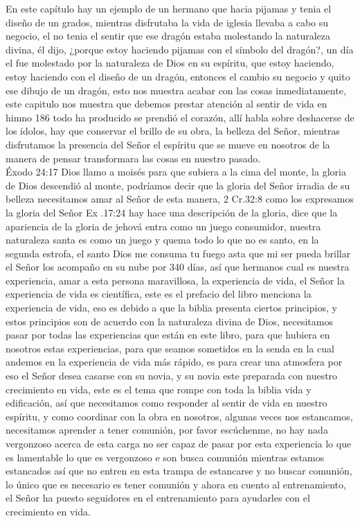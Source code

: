 \documentclass[12pt]{article}
\begin{document}
En este capítulo hay un ejemplo de un hermano que hacia pijamas y tenia el diseño de un grados, mientras disfrutaba la vida de iglesia llevaba a cabo su negocio, el no tenia el sentir que ese dragón estaba molestando la naturaleza divina, él dijo, ¿porque estoy haciendo pijamas con el símbolo del dragón?, un día el fue molestado por la naturaleza de Dios en su espíritu, que estoy  haciendo, estoy haciendo con el diseño de un dragón, entonces el cambio su negocio y quito ese dibujo de un dragón, esto nos muestra acabar con las cosas inmediatamente, este capitulo nos muestra que debemos prestar atención al sentir de vida en himno 186 todo ha producido se prendió el corazón, allí habla sobre deshacerse de los ídolos, hay que conservar el brillo de su obra, la belleza del Señor, mientras disfrutamos la presencia del Señor el espíritu que se mueve en nosotros de la manera de pensar transformara las cosas en nuestro pasado.\\

Éxodo 24:17 Dios llamo a moisés para que subiera  a la cima del monte, la gloria de Dios descendió al monte, podríamos decir que la gloria del Señor irradia de su belleza necesitamos amar al Señor de esta manera, 2 Cr.32:8 como los expresamos la gloria del Señor Ex .17:24 hay hace una descripción de la gloria, dice que la apariencia de la gloria de jehová entra como un juego consumidor, nuestra naturaleza santa es como un juego y quema todo lo que no es santo, en la segunda estrofa, el santo Dios me consuma tu fuego asta que mi ser pueda brillar el Señor los acompaño en su nube por 340 días, así que hermanos cual es nuestra experiencia, amar a esta persona maravillosa, la experiencia de vida, el Señor la experiencia de vida es científica, este es el prefacio del libro menciona la experiencia de vida, eso es debido a que la biblia presenta ciertos principios, y estos principios son de acuerdo con la naturaleza divina de Dios, necesitamos pasar por todas las experiencias que están en este libro, para que hubiera en nosotros estas experiencias, para que seamos sometidos en la senda en la cual andemos en la experiencia de vida  más rápido, es para crear una atmosfera por eso el Señor desea casarse con su novia, y su novia este preparada con nuestro crecimiento en vida, este es el tema que rompe con toda la biblia vida y edificación, así que necesitamos como responder al sentir de vida en nuestro espíritu, y como coordinar con la obra en nosotros, algunas veces nos estancamos, necesitamos aprender a tener comunión, por favor escúchenme, no hay nada vergonzoso acerca de esta carga no ser capaz de pasar por esta experiencia lo que es lamentable lo que es vergonzoso e son busca comunión mientras estamos estancados así que no entren en esta trampa de estancarse y no buscar comunión, lo único que es necesario es tener comunión y ahora en cuento al entrenamiento, el Señor ha puesto seguidores en el entrenamiento para ayudarles con el crecimiento en vida.\\
\end{document}

